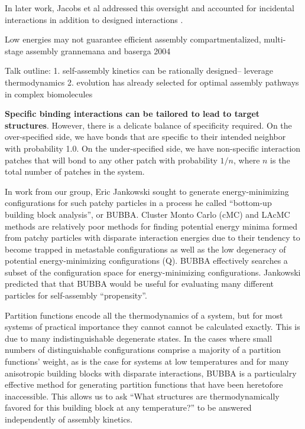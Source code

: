 In later work, Jacobs et al addressed this oversight and accounted for incidental interactions in addition to designed interactions \cite{Jacobs_2015_PNAS}.


Low energies may not guarantee efficient assembly
compartmentalized, multi-stage assembly
grannemana and baserga 2004

Talk outline:
1. self-assembly kinetics can be rationally designed-- leverage thermodynamics
2. evolution has already selected for optimal assembly pathways in complex biomolecules


\textbf{Specific binding interactions can be tailored to lead to target structures}.
However, there is a delicate balance of specificity required.
On the over-specified side, we have bonds that are specific to their intended neighbor with probability 1.0.
On the under-specified side, we have non-specific interaction patches that will bond to any other patch with probability $1/n$, where $n$ is the total number of patches in the system.

In work from our group, Eric Jankowski sought to generate energy-minimizing configurations for such patchy particles \cite{Jankowski_2009_JChemPhys} in a process he called ``bottom-up building block analysis'', or BUBBA.
Cluster Monto Carlo (cMC) and LAcMC methods are relatively poor methods for finding potential energy minima formed from patchy particles with disparate interaction energies due to their tendency to become trapped in metastable configurations as well as the low degeneracy of potential energy-minimizing configurations (Q).
BUBBA effectively searches a subset of the configuration space for energy-minimizing configurations.
Jankowski predicted that that BUBBA would be useful for evaluating many different particles for self-assembly ``propensity''.

Partition functions encode all the thermodynamics of a system, but for most systems of practical importance they cannot cannot be calculated exactly.
This is due to many indistinguishable degenerate states. 
In the cases where small numbers of distinguishable configurations comprise a majority of a partition functions' weight, as is the case for systems at low temperatures and for many anisotropic building blocks with disparate interactions, BUBBA is a particulalry effective method for generating partition functions that have been heretofore inaccessible. 
This allows us to ask ``What structures are thermodynamically favored for this building block at any temperature?'' to be answered independently of assembly kinetics. \cite{Jankowski_2011_JPhysChemB}

